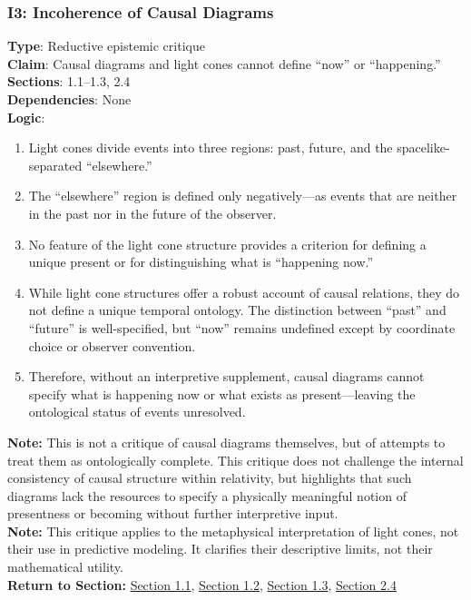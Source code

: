 \documentclass[12pt]{book}
\begin{document}
\subsubsection*{I3: Incoherence of Causal Diagrams}
\label{appendix:I3}
\textbf{Type}: Reductive epistemic critique\\
\textbf{Claim}: Causal diagrams and light cones cannot define ``now'' or ``happening.''\\
\textbf{Sections}: 1.1–1.3, 2.4\\
\textbf{Dependencies}: None\\
\textbf{Logic}:
\begin{enumerate}
    \item Light cones divide events into three regions: past, future, and the spacelike-separated ``elsewhere.''
    \item The ``elsewhere'' region is defined only negatively---as events that are neither in the past nor in the future of the observer.
    \item No feature of the light cone structure provides a criterion for defining a unique present or for distinguishing what is ``happening now.''
    \item While light cone structures offer a robust account of causal relations, they do not define a unique temporal ontology. The distinction between ``past'' and ``future'' is well-specified, but ``now'' remains undefined except by coordinate choice or observer convention.
    \item Therefore, without an interpretive supplement, causal diagrams cannot specify what is happening now or what exists as present---leaving the ontological status of events unresolved.
\end{enumerate}
\textbf{Note:} This is not a critique of causal diagrams themselves, but of attempts to treat them as ontologically complete. This critique does not challenge the internal consistency of causal structure within relativity, but highlights that such diagrams lack the resources to specify a physically meaningful notion of presentness or becoming without further interpretive input.\\
\textbf{Note:} This critique applies to the metaphysical interpretation of light cones, not their use in predictive modeling. It clarifies their descriptive limits, not their mathematical utility.\\
\textbf{Return to Section:} \hyperref[sec:1.1]{Section 1.1}, \hyperref[sec:1.2]{Section 1.2}, \hyperref[sec:1.3]{Section 1.3}, \hyperref[sec:2.4]{Section 2.4}
\end{document}

